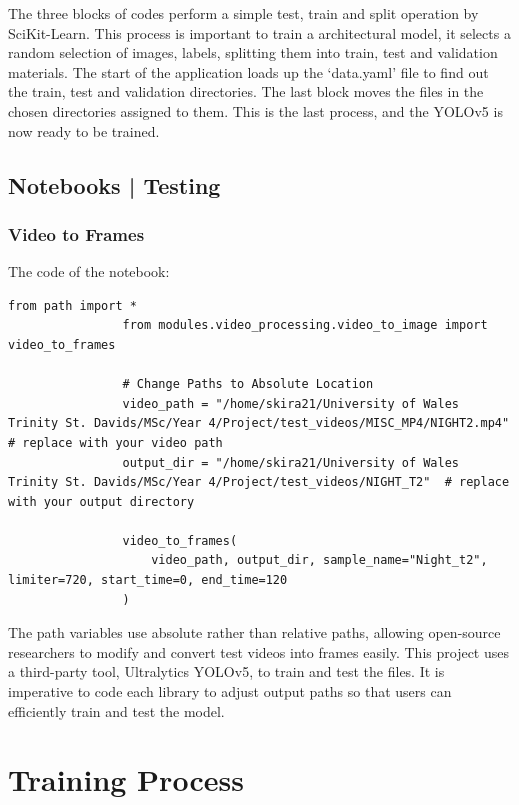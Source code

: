 \documentclass[12pt]{report} %
\begin{document}
			The three blocks of codes perform a simple test, train and split operation by SciKit-Learn. This process is important to train a architectural model, it selects a random selection of images, labels, splitting them into train, test and validation materials. The start of the application loads up the `data.yaml' file to find out the train, test and validation directories. The last block moves the files in the chosen directories assigned to them. This is the last process, and the YOLOv5 is now ready to be trained. 

	\section{Notebooks | Testing}
		\subsection*{Video to Frames}
			The code of the notebook:
			\begin{lstlisting}[tabsize=1]
				from path import *
				from modules.video_processing.video_to_image import video_to_frames

				# Change Paths to Absolute Location
				video_path = "/home/skira21/University of Wales Trinity St. Davids/MSc/Year 4/Project/test_videos/MISC_MP4/NIGHT2.mp4"  # replace with your video path
				output_dir = "/home/skira21/University of Wales Trinity St. Davids/MSc/Year 4/Project/test_videos/NIGHT_T2"  # replace with your output directory

				video_to_frames(
					video_path, output_dir, sample_name="Night_t2", limiter=720, start_time=0, end_time=120
				)
			\end{lstlisting}

			The path variables use absolute rather than relative paths, allowing open-source researchers to modify and convert test videos into frames easily. This project uses a third-party tool, Ultralytics YOLOv5, to train and test the files. It is imperative to code each library to adjust output paths so that users can efficiently train and test the model.

\chapter{Training Process}
\label{chap:trainingProcess}
\end{document}
